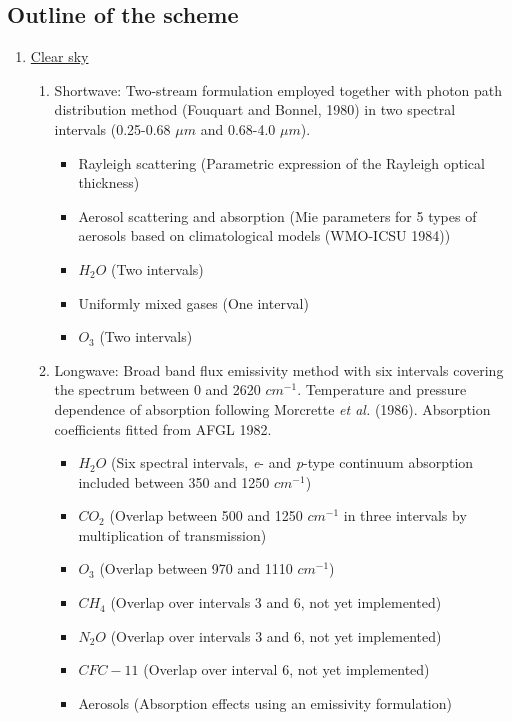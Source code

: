 \subsection{Outline of the scheme}
%

\begin{enumerate}


\item \underline{Clear sky}

\begin{enumerate}
\item Shortwave: Two-stream formulation employed together with photon path
distribution method (Fouquart and Bonnel, 1980) in two spectral intervals
(0.25-0.68 $\mu m$ and 0.68-4.0 $\mu m$).\footnotemark
%
\begin{itemize}
               \item Rayleigh scattering (Parametric expression of the Rayleigh optical thickness)
               \item Aerosol scattering and absorption (Mie parameters for 5 types of aerosols based on climatological models (WMO-ICSU 1984))
               \item $H_{2}O$ (Two intervals)
               \item Uniformly mixed gases (One interval)
              \item $O_{3}$ (Two intervals)
\end{itemize}

\item Longwave: Broad band flux emissivity method with six intervals covering the spectrum between 0 and 2620 $cm^{-1}$. Temperature and pressure dependence of absorption following Morcrette {\em et al.} (1986). Absorption coefficients fitted from AFGL 1982.

\begin{itemize}
            \item $H_{2}O$ (Six spectral intervals, {\em e}- and {\em p}-type continuum absorption included between 350 and 1250 $cm^{-1}$)
            \item $CO_{2}$ (Overlap between 500 and 1250 $cm^{-1}$ in three intervals by multiplication of transmission)
            \item $O_{3}$ (Overlap between 970 and 1110 $cm^{-1}$)
            \item $CH_{4}$ (Overlap over intervals 3 and 6, not yet implemented)
            \item $N_{2}O$ (Overlap over intervals 3 and 6, not yet implemented)
            \item $CFC-11$ (Overlap over interval 6, not yet implemented)
            \item Aerosols (Absorption effects using an emissivity formulation)
\end{itemize}


\end{enumerate}
\end{enumerate}
